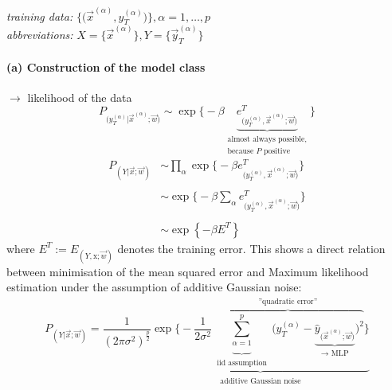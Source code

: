 \emph{training data:} $\Big\{ \big( \vec{x}^{(\alpha)}, y_T^{(\alpha)} \big)
	\Big\}, \alpha = 1, \ldots, p$ \\

\emph{abbreviations:} $X = \Big\{ \vec{x}^{(\alpha)} \Big\}, 
	Y = \Big\{ \vec{y}_T^{(\alpha)} \Big\}$


\paragraph{(a) Construction of the model class}
$\rightarrow$ likelihood of the data 
\begin{equation}
	P_{\big( y_T^{(\alpha)}| \vec{x}^{(\alpha)}; \vec{w} \big)}
	\sim \exp \Big\{ -\beta \underbrace{ 
		e_{\big( y_T^{(\alpha)}, \vec{x}^{(\alpha)}; 
		\vec{w}\big)}^T }_{ \substack{
			\text{almost always possible,} \\
			\text{because } P \text{ positive}}}
	\Big\}
\end{equation}
\begin{equation}
	\begin{array}{ll}
	P_{(Y|\vec{x};\vec{w})}
	& \sim \prod\limits_{\alpha} \exp \Big\{ -\beta 
		e_{\big( y_T^{(\alpha)}, \vec{x}^{(\alpha)}; \vec{w}\big)}^T
		\Big\} \\\\
	& \sim \exp \Big\{ -\beta \sum\limits_{\alpha} 
		e_{\big( y_T^{(\alpha)}, \vec{x}^{(\alpha)}; \vec{w}\big)}^T
		\Big\} \\\\
	& \sim \exp \left\{-\beta E^T \right\}
	\end{array}
\label{eq:likelihoodData}
\end{equation}
where $E^T:=E_{(Y, \mathrm{x}; \vec{w})}$ denotes the training
error. This shows a direct relation between minimisation of the
mean squared error and Maximum likelihood estimation under the
assumption of additive Gaussian noise:
\begin{equation}
	P_{(Y| \vec{x};\vec{w})} = 
	\frac{1}{(2 \pi \sigma^2)^{\frac{p}{2}}} 
	\underbrace{
	\exp \Bigg\{ -\frac{1}{2 \sigma^2} 
		\overbrace{
		\underbrace{ \sum\limits_{\alpha = 1}^p }_{
			\substack{ \text{iid assumption}} }
		\Big( y_T^{(\alpha)} 
		- \underbrace{ \widehat{y}_{\big(\vec{x}^{(\alpha)}; \vec{w})}
			}_{\substack{ \rightarrow \text{ MLP}}}
		\Big)^2 }^{ \substack{ \text{''quadratic error''} } }
	\Bigg\}
	}_{ \substack{\text{additive Gaussian noise}}}
\end{equation}

